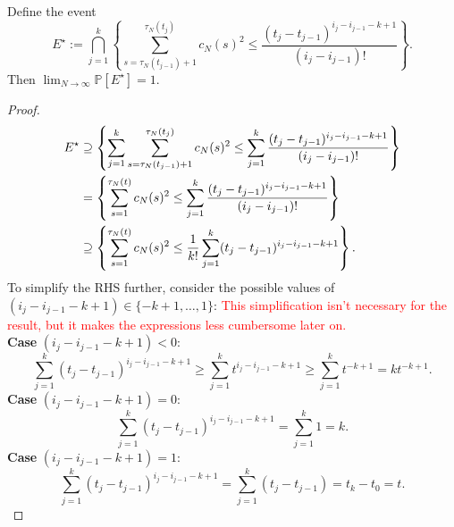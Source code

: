 \documentclass{article}
\newcommand{\seb}[1]{\xspace\textcolor{red}{#1}\xspace}
\newcommand{\Prob}{\mathbb{P}}
\newcommand{\1}[1]{\mathbbm{1}_{#1}}
\begin{document}
\begin{lemma}\label{thm:indicators_c2}
Define the event
\begin{equation}
E^\star := \bigcap_{j=1}^k \left\{ \sum_{s=\tau_N(t_{j-1})+1}^{\tau_N(t_j)}
        c_N(s)^2 \leq \frac{ (t_j - t_{j-1})^{i_j - i_{j-1} -k +1} }{ (i_j - i_{j-1})! }
        \right\} .
\end{equation}
Then $\lim_{N\to\infty} \Prob[E^\star] =1$.
\end{lemma}

\begin{proof}
\begin{align}
E^\star
&\supseteq \left\{ \sum_{j=1}^k \sum_{s=\tau_N(t_{j-1})+1}^{\tau_N(t_j)}
        c_N(s)^2 \leq \sum_{j=1}^k \frac{ (t_j - t_{j-1})^{i_j - i_{j-1} -k +1} }
        { (i_j - i_{j-1})! } \right\} \notag\\
&= \left\{ \sum_{s=1}^{\tau_N(t)} c_N(s)^2 \leq 
        \sum_{j=1}^k \frac{ (t_j - t_{j-1})^{i_j - i_{j-1} -k +1} }
        { (i_j - i_{j-1})! } \right\} \notag\\
&\supseteq \left\{ \sum_{s=1}^{\tau_N(t)} c_N(s)^2 \leq 
        \frac{1}{k!} \sum_{j=1}^k (t_j - t_{j-1})^{i_j - i_{j-1} -k +1} 
        \right\} .
\end{align}
To simplify the RHS further, consider the possible values of $(i_j - i_{j-1} -k +1) \in \{-k+1,\dots,1\}$:
\seb{This simplification isn't necessary for the result, but it makes the expressions less cumbersome later on.}\\
\textbf{Case} $(i_j - i_{j-1} -k +1) <0$:\\
\begin{equation}
\sum_{j=1}^k (t_j - t_{j-1})^{i_j - i_{j-1} -k +1}
\geq \sum_{j=1}^k t^{i_j - i_{j-1} -k +1} 
\geq \sum_{j=1}^k t^{-k +1} 
= kt^{-k+1}.
\end{equation}
\textbf{Case} $(i_j - i_{j-1} -k +1) =0$:\\
\begin{equation}
\sum_{j=1}^k (t_j - t_{j-1})^{i_j - i_{j-1} -k +1}
= \sum_{j=1}^k 1
=k .
\end{equation}
\textbf{Case} $(i_j - i_{j-1} -k +1) =1$:\\
\begin{equation}
\sum_{j=1}^k (t_j - t_{j-1})^{i_j - i_{j-1} -k +1}
= \sum_{j=1}^k (t_j - t_{j-1})
= t_k - t_0
=t .
\end{equation}

\end{proof}
\end{document}
